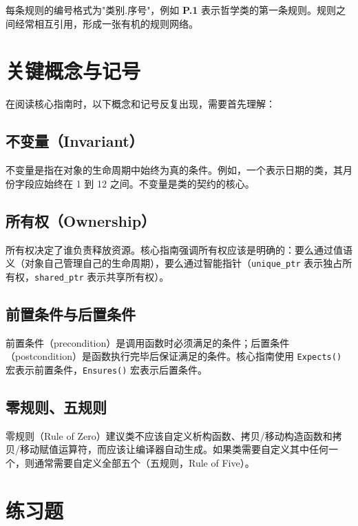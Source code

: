每条规则的编号格式为"类别.序号"，例如 \textbf{P.1} 表示哲学类的第一条规则。规则之间经常相互引用，形成一张有机的规则网络。

\section{关键概念与记号}

在阅读核心指南时，以下概念和记号反复出现，需要首先理解：

\subsection{不变量（Invariant）}

不变量是指在对象的生命周期中始终为真的条件。例如，一个表示日期的类，其月份字段应始终在 1 到 12 之间。不变量是类的契约的核心。

\subsection{所有权（Ownership）}

所有权决定了谁负责释放资源。核心指南强调所有权应该是明确的：要么通过值语义（对象自己管理自己的生命周期），要么通过智能指针（\texttt{unique\_ptr} 表示独占所有权，\texttt{shared\_ptr} 表示共享所有权）。

\subsection{前置条件与后置条件}

前置条件（precondition）是调用函数时必须满足的条件；后置条件（postcondition）是函数执行完毕后保证满足的条件。核心指南使用 \texttt{Expects()} 宏表示前置条件，\texttt{Ensures()} 宏表示后置条件。

\subsection{零规则、五规则}

零规则（Rule of Zero）建议类不应该自定义析构函数、拷贝/移动构造函数和拷贝/移动赋值运算符，而应该让编译器自动生成。如果类需要自定义其中任何一个，则通常需要自定义全部五个（五规则，Rule of Five）。

\section*{练习题}

